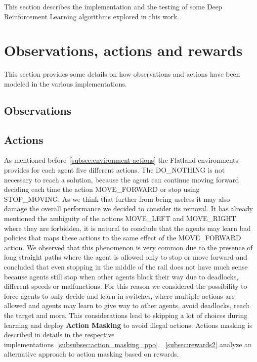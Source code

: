 \documentclass[11pt, a4paper, hidelinks]{report}
\begin{document}
This section describes the implementation and the testing of some Deep Reinforcement Learning algorithms explored in this work.

\section{Observations, actions and rewards}\label{sec:observations-and-actions}

This section provides some details on how observations and actions have been modeled in the various implementations.

\subsection{Observations}\label{subsec:observations}


\subsection{Actions}\label{subsec:actions}
As mentioned before~\ref{subsec:environment-actions} the Flatland environments provides for each agent five different actions.
The DO\_NOTHING is not necessary to reach a solution, because the agent can continue moving forward deciding each time the action MOVE\_FORWARD or stop using STOP\_MOVING\@.
As we think that further from being useless it may also damage the overall performance we decided to consider its removal.
It has already mentioned the ambiguity of the actions MOVE\_LEFT and MOVE\_RIGHT where they are forbidden, it is natural to conclude that the agents may learn bad policies that maps these actions to the same effect of the MOVE\_FORWARD action.
We observed that this phenomenon is very common due to the presence of long straight paths where the agent is allowed only to stop or move forward and concluded that even stopping in the middle of the rail does not have much sense because agents still stop when other agents block their way due to deadlocks, different speeds or malfunctions.
For this reason we considered the possibility to force agents to only decide and learn in switches, where multiple actions are allowed and agents may learn to give way to other agents, avoid deadlocks, reach the target and more.
This considerations lead to skipping a lot of choices during learning and deploy \textbf{Action Masking} to avoid illegal actions.
Actions masking is described in details in the respective implementations~\ref{subsubsec:action_masking_ppo}.
~\ref{subsec:rewards2} analyze an alternative approach to action masking based on rewards.
\end{document}
